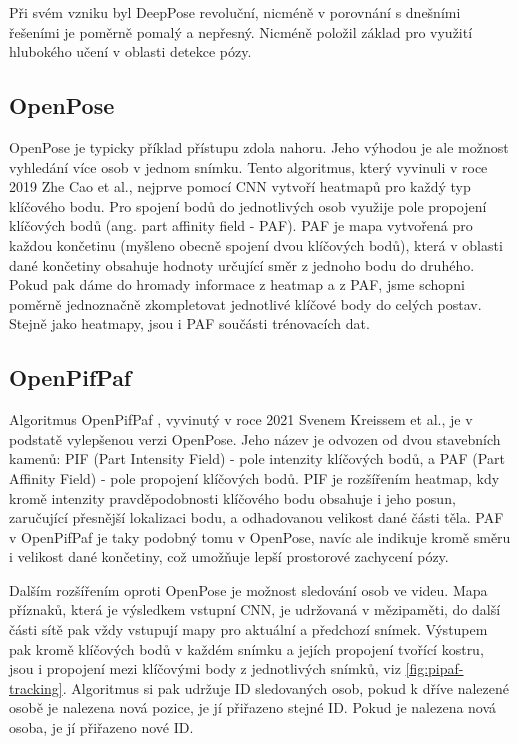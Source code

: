 Při svém vzniku byl DeepPose revoluční, nicméně v porovnání s dnešními řešeními
je poměrně pomalý a nepřesný. Nicméně položil základ pro využití hlubokého
učení v oblasti detekce pózy.

\subsection{OpenPose}

OpenPose \cite{openpose} je typicky příklad přístupu zdola nahoru. Jeho výhodou
je ale možnost vyhledání více osob v jednom snímku. Tento algoritmus, který
vyvinuli v roce 2019 Zhe Cao et al., nejprve pomocí CNN vytvoří heatmapů pro
každý typ klíčového bodu. Pro spojení bodů do jednotlivých osob využije pole
propojení klíčových bodů (ang. part affinity field - PAF). PAF je mapa
vytvořená pro každou končetinu (myšleno obecně spojení dvou klíčových bodů),
která v oblasti dané končetiny obsahuje hodnoty určující směr z jednoho bodu do
druhého. Pokud pak dáme do hromady informace z heatmap a z PAF, jsme schopni
poměrně jednoznačně zkompletovat jednotlivé klíčové body do celých postav.
Stejně jako heatmapy, jsou i PAF součásti trénovacích dat.

\subsection{OpenPifPaf}

Algoritmus OpenPifPaf \cite{openpifpaf}, vyvinutý v roce 2021 Svenem Kreissem
et al., je v podstatě vylepšenou verzi OpenPose. Jeho název je odvozen od dvou
stavebních kamenů: PIF (Part Intensity Field) - pole intenzity klíčových bodů,
a PAF (Part Affinity Field) - pole propojení klíčových bodů. PIF je rozšířením
heatmap, kdy kromě intenzity pravděpodobnosti klíčového bodu obsahuje i jeho
posun, zaručující přesnější lokalizaci bodu, a odhadovanou velikost dané části
těla. PAF v OpenPifPaf je taky podobný tomu v OpenPose, navíc ale indikuje
kromě směru i velikost dané končetiny, což umožňuje lepší prostorové zachycení
pózy.

Dalším rozšířením oproti OpenPose je možnost sledování osob ve videu. Mapa
příznaků, která je výsledkem vstupní CNN, je udržovaná v mězipaměti, do další
části sítě pak vždy vstupují mapy pro aktuální a předchozí snímek. Výstupem pak
kromě klíčových bodů v každém snímku a jejích propojení tvořící kostru, jsou i
propojení mezi klíčovými body z jednotlivých snímků, viz
\ref{fig:pipaf-tracking}. Algoritmus si pak udržuje ID sledovaných osob, pokud
k dříve nalezené osobě je nalezena nová pozice, je jí přiřazeno stejné ID.
Pokud je nalezena nová osoba, je jí přiřazeno nové ID.


